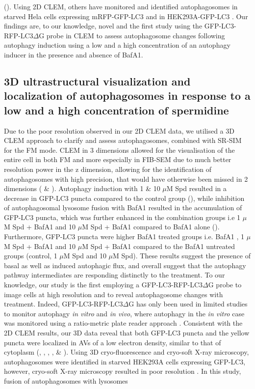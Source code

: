 (). Using 2D CLEM, others have monitored and identified autophagosomes in starved Hela cells expressing mRFP-GFP-LC3 \citep{Gudmundsson2019} and in HEK293A-GFP-LC3 \citep{Razi2009}. Our findings are, to our knowledge, novel and the first study using the GFP-LC3-RFP-LC3$\Delta$G probe in CLEM to assess autophagosome changes following autophagy induction using a low and a high concentration of an autophagy inducer in the presence and absence of BafA1.

\subsection{3D ultrastructural visualization and localization of autophagosomes in response to a low and a high concentration of spermidine}
Due to the poor resolution observed in our 2D CLEM data, we utilised a 3D CLEM approach to clarify and assess autophagosomes, combined with SR-SIM for the FM mode. CLEM in 3 dimensions allowed for the visualisation of the entire cell in both FM and more especially in FIB-SEM due to much better resolution power in the z dimension, allowing for the identification of autophagosomes with high precision, that would have otherwise been missed in 2 dimensions ( \& ). Autophagy induction with 1 \& 10 $\mu$M Spd resulted in a decrease in GFP-LC3 puncta compared to the control group (), while inhibition of autophagosomal lysosome fusion with BafA1 resulted in the accumulation of GFP-LC3 puncta, which was further enhanced in the combination groups i.e 1 $\mu$M Spd + BafA1 and 10 $\mu$M Spd + BafA1 compared to BafA1 alone (). Furthermore, GFP-LC3 puncta were higher BafA1 treated groups i.e. BafA1 , 1 $\mu$M Spd + BafA1 and 10 $\mu$M Spd + BafA1 compared to the BafA1 untreated groups (control, 1 $\mu$M Spd and 10 $\mu$M Spd). These results suggest the presence of basal as well as induced autophagic flux, and overall suggest that the autophagy pathway intermediates are responding distinctly to the treatment. To our knowledge, our study is the first employing a GFP-LC3-RFP-LC3$\Delta$G probe to image cells at high resolution and to reveal autophagosome changes with treatment. Indeed, GFP-LC3-RFP-LC3$\Delta$G has only been used in limited studies to monitor autophagy \textit{in vitro} and \textit{in vivo}, where autophagy in the \textit{in vitro} case was monitored using a ratio-metric plate reader approach \citep{Kaizuka2016}. Consistent with the 2D CLEM results, our 3D data reveal that both GFP-LC3 puncta and the yellow puncta were localized in AVs of a low electron density, similar to that of cytoplasm (, , , ,  \& ). Using 3D cryo-fluorescence and cryo-soft X-ray microscopy, autophagosomes were identified in starved HEK293A cells expressing GFP-LC3, however, cryo-soft X-ray microscopy resulted in poor resolution \citep{Duke2014}. In this study, fusion of autophagosomes with lysosomes 